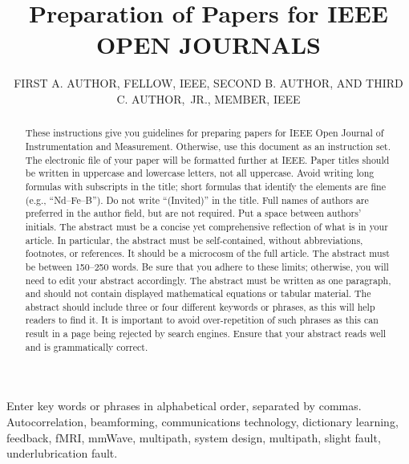 \documentclass{ieeeojpel}
\begin{document}

\title{Preparation of Papers for IEEE OPEN JOURNALS}

\author{FIRST A. AUTHOR, FELLOW, IEEE, SECOND B.
AUTHOR, AND THIRD C. AUTHOR,~JR.,
MEMBER, IEEE}

\begin{abstract}
These instructions give you guidelines for preparing papers for IEEE
Open Journal of Instrumentation and Measurement.
 Otherwise, use this document as an instruction set. The electronic file of your paper will be formatted further at IEEE. Paper titles should be written in uppercase and lowercase letters, not all uppercase. Avoid writing long formulas with subscripts in the title; short formulas that identify the elements are fine (e.g., ``Nd--Fe--B''). Do not write ``(Invited)'' in the title. Full names of authors are preferred in the author field, but are not required. Put a space between authors' initials. The abstract must be a concise yet comprehensive reflection of what is in your article. In particular, the abstract must be self-contained, without abbreviations, footnotes, or references. It should be a microcosm of the full article. The abstract must be between 150--250 words. Be sure that you adhere to these limits; otherwise, you will need to edit your abstract accordingly. The abstract must be written as one paragraph, and should not contain displayed mathematical equations or tabular material. The abstract should include three or four different keywords or phrases, as this will help readers to find it. It is important to avoid over-repetition of such phrases as this can result in a page being rejected by search engines. Ensure that your abstract reads well and is grammatically correct.
\end{abstract}

\begin{IEEEkeywords}
Enter key words or phrases in alphabetical order, separated by commas. Autocorrelation,
beamforming, communications technology, dictionary learning, feedback, fMRI, mmWave, multipath,
system design, multipath, slight fault, underlubrication fault.
\end{IEEEkeywords}
\end{document}
